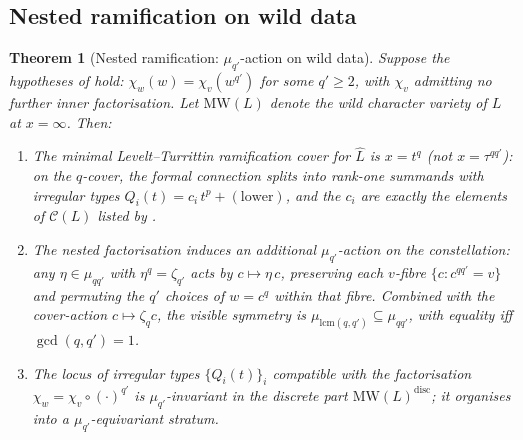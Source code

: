 \documentclass[aip,jmp,preprint,amsmath,amssymb,nofootinbib,floatfix]{revtex4-2}
\theoremstyle{plain}
\newtheorem{theorem}{Theorem}[section]
\theoremstyle{definition}
\theoremstyle{remark}
\newcommand{\Cl}{\mathcal{C}}
\newcommand{\MW}{\mathrm{MW}}
\begin{document}
\subsection{Nested ramification on wild data}\label{ssec:AT3}

\begin{theorem}[Nested ramification: $\mu_{q'}$-action on wild data]\label{thm:AT3}
Suppose the hypotheses of  hold: $\chi_w(w) = \chi_v(w^{q'})$
for some $q' \ge 2$, with $\chi_v$ admitting no further inner factorisation.
Let $\MW(L)$ denote the wild character variety of $L$ at $x = \infty$.
Then:
\begin{enumerate}[leftmargin=2em]
\item The minimal Levelt--Turrittin ramification cover for $\widehat{L}$
      is $x = t^q$ (not $x = \tau^{qq'}$): on the $q$-cover, the formal
      connection splits into rank-one summands with irregular types
      $Q_i(t) = c_i\, t^p + (\text{lower})$, and the $c_i$ are exactly
      the elements of $\Cl(L)$ listed by .
\item The nested factorisation induces an \emph{additional}
      $\mu_{q'}$-action on the constellation: any $\eta \in \mu_{qq'}$
      with $\eta^q = \zeta_{q'}$ acts by $c \mapsto \eta\, c$, preserving
      each $v$-fibre $\{c : c^{qq'} = v\}$ and permuting the $q'$ choices
      of $w = c^q$ within that fibre. Combined with the cover-action
      $c \mapsto \zeta_q c$, the visible symmetry is $\mu_{\mathrm{lcm}(q,
      q')} \subseteq \mu_{qq'}$, with equality iff $\gcd(q, q') = 1$.
\item The locus of irregular types $\{Q_i(t)\}_i$ compatible with the
      factorisation $\chi_w = \chi_v \circ (\cdot)^{q'}$ is
      $\mu_{q'}$-invariant in the discrete part $\MW(L)^{\mathrm{disc}}$;
      it organises into a $\mu_{q'}$-equivariant stratum.
\end{enumerate}
\end{theorem}
\end{document}
